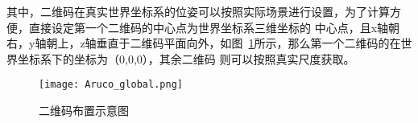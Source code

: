 其中，二维码在真实世界坐标系的位姿可以按照实际场景进行设置，为了计算方便，直接设定第一个二维码的中心点为世界坐标系三维坐标的
中心点，且x轴朝右，y轴朝上，z轴垂直于二维码平面向外，如图~\ref{fig:Aruco_global}所示，那么第一个二维码的在世界坐标系下的坐标为（0,0,0），其余二维码
则可以按照真实尺度获取。
\begin{figure}[H] %
  \centering
  \texttt{[image: Aruco\_global.png]}
  \caption{二维码布置示意图}
  \label{fig:Aruco_global}
\end{figure}
